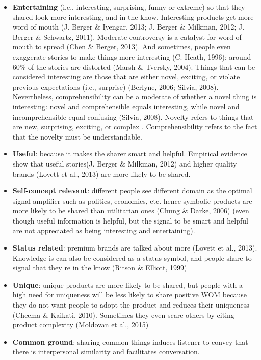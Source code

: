 \documentclass[
]{book}
\begin{document}
\begin{itemize}
\item
  \textbf{Entertaining} (i.e., interesting, surprising, funny or extreme) so that they shared look more interesting, and in-the-know. Interesting products get more word of mouth (J. Berger \& Iyengar, 2013; J. Berger \& Milkman, 2012; J. Berger \& Schwartz, 2011). Moderate controversy is a catalyst for word of mouth to spread (Chen \& Berger, 2013). And sometimes, people even exaggerate stories to make things more interesting (C. Heath, 1996); around 60\% of the stories are distorted (Marsh \& Tversky, 2004). Things that can be considered interesting are those that are either novel, exciting, or violate previous expectations (i.e., surprise) (Berlyne, 2006; Silvia, 2008). Nevertheless, comprehensibility can be a moderate of whether a novel thing is interesting: novel and comprehensible equals interesting, while novel and incomprehensible equal confusing (Silvia, 2008). Novelty refers to things that are new, surprising, exciting, or complex \citep{Berlyne_1960}. Comprehensibility refers to the fact that the novelty must be understandable.
\item
  \textbf{Useful}: because it makes the sharer smart and helpful. Empirical evidence show that useful stories(J. Berger \& Milkman, 2012) and higher quality brands (Lovett et al., 2013) are more likely to be shared.
\item
  \textbf{Self-concept relevant}: different people see different domain as the optimal signal amplifier such as politics, economics, etc. hence symbolic products are more likely to be shared than utilitarian ones (Chung \& Darke, 2006) (even though useful information is helpful, but the signal to be smart and helpful are not appreciated as being interesting and entertaining).
\item
  \textbf{Status related}: premium brands are talked about more (Lovett et al., 2013). Knowledge is can also be considered as a status symbol, and people share to signal that they re in the know (Ritson \& Elliott, 1999)
\item
  \textbf{Unique}: unique products are more likely to be shared, but people with a high need for uniqueness will be less likely to share positive WOM because they do not want people to adopt the product and reduces their uniqueness (Cheema \& Kaikati, 2010). Sometimes they even scare others by citing product complexity (Moldovan et al., 2015)
\item
  \textbf{Common ground}: sharing common things induces listener to convey that there is interpersonal similarity and facilitates conversation.

\end{itemize}
\end{document}
